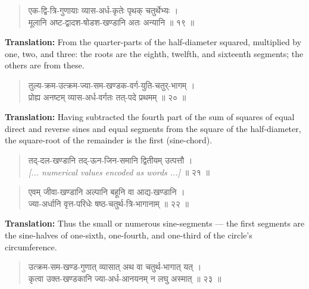 \documentclass[11pt,a4paper]{article}
\newenvironment{shloka}{\begin{verse}\devanagarifont\large}{\end{verse}}
\begin{document}
\vspace{0.3cm}

\begin{shloka}
एक-द्वि-त्रि-गुणायाः व्यास-अर्ध-कृतेः पृथक् चतुर्थेभ्यः ।\\
मूलानि अष्ट-द्वादश-षोडश-खण्डानि अतः अन्यानि ॥ १९ ॥
\end{shloka}

\textbf{Translation:}\quad
From the quarter-parts of the half-diameter squared, multiplied by
one, two, and three: the roots are the eighth, twelfth, and sixteenth
segments; the others are from these.

\vspace{0.3cm}

\begin{shloka}
तुल्य-क्रम-उत्क्रम-ज्या-सम-खण्डक-वर्ग-युति-चतुर्-भागम् ।\\
प्रोह्य अनष्टम् व्यास-अर्ध-वर्गतः तत्-पदे प्रथमम् ॥ २० ॥
\end{shloka}

\textbf{Translation:}\quad
Having subtracted the fourth part of the sum of squares of equal
direct and reverse sines and equal segments from the square of the
half-diameter, the square-root of the remainder is the first
(sine-chord).

\vspace{0.3cm}

\begin{shloka}
तद्-दल-खण्डानि तद्-ऊन-जिन-समानि द्वितीयम् उत्पत्तौ ।\\
\textit{[... numerical values encoded as words ...]} ॥ २१ ॥
\end{shloka}

\vspace{0.3cm}

\begin{shloka}
एवम् जीवा-खण्डानि अल्पानि बहूनि वा आद्य-खण्डानि ।\\
ज्या-अर्धानि वृत्त-परिधेः षष्ठ-चतुर्थ-त्रि-भागानाम् ॥ २२ ॥
\end{shloka}

\textbf{Translation:}\quad
Thus the small or numerous sine-segments — the first segments are the
sine-halves of one-sixth, one-fourth, and one-third of the circle's
circumference.

\vspace{0.3cm}

\begin{shloka}
उत्क्रम-सम-खण्ड-गुणात् व्यासात् अथ वा चतुर्थ-भागात् यत् ।\\
कृत्वा उक्त-खण्डकानि ज्या-अर्ध-आनयनम् न लघु अस्मात् ॥ २३ ॥
\end{shloka}
\end{document}
